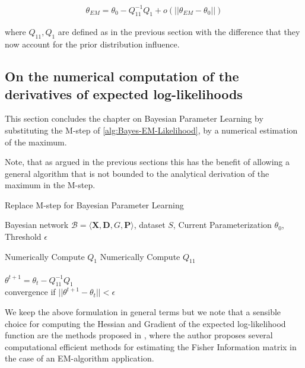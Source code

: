 \documentclass[11pt]{article}
\begin{document}
\begin{article}
\begin{align} 
 \theta_{EM}  = \theta_{0} - Q_{11}^{-1} Q_1 + o(||\theta_{EM} - \theta_{0}||) \label{eq:em-iterative}
\end{align}

where \(Q_{11}, Q_1\) are defined as in the previous section with the
difference that they now account for the prior distribution
influence.

\subsection{On the numerical computation of the derivatives of expected log-likelihoods}
\label{sec:org8962bd4}

This section concludes the chapter on Bayesian Parameter Learning
by substituting the M-step of \ref{alg:Bayes-EM-Likelihood}, by a
numerical estimation of the maximum.

Note, that as argued in the previous sections this has the benefit
of allowing a general algorithm that is not bounded to the
analytical derivation of the maximum in the M-step.

\begin{algorithm*}[h!]
\caption{Replace M-step for Bayesian Parameter Learning}
\label{alg:Numerical-M-Step}
\vspace{-10pt}
\begin{multicols}{2}
\begin{algorithmic}[1] 
\Require Bayesian network $\mathcal{B}=\langle \mathbf{X},\mathbf{D}, G, \mathbf{P} \rangle$, dataset $S$, Current Parameterization $\theta_0$, Threshold $\epsilon$

   \State Numerically Compute $Q_1$
   \State Numerically Compute $Q_{11}$\\

   \\
      \State $\theta^{t+1}= \theta_{t} - Q_{11}^{-1} Q_1$\\
      \State convergence if $||\theta^{t+1} - \theta_{t}|| < \epsilon$
   \EndForAll
\end{algorithmic}
\end{multicols}
\end{algorithm*}

We keep the above formulation in general terms but we note that a
sensible choice for computing the Hessian and Gradient of the
expected log-likelihood function are the methods proposed in
\cite{meng2016method}, where the author proposes several
computational efficient methods for estimating the Fisher
Information matrix in the case of an EM-algorithm application. 


\end{article}
\end{document}
